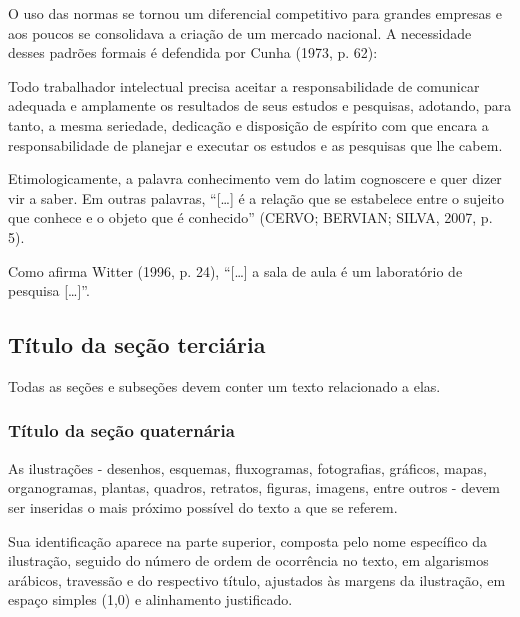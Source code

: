 O uso das normas se tornou um diferencial competitivo para grandes empresas e aos poucos se consolidava a criação de um mercado nacional. A necessidade desses padrões formais é defendida por Cunha (1973, p. 62):

\begin{SingleSpace}
\begin{flushright}
\begin{minipage}[b]{12cm}
\begin{small}
Todo trabalhador intelectual precisa aceitar a responsabilidade de comunicar adequada e amplamente os resultados de seus estudos e pesquisas, adotando, para tanto, a mesma seriedade, dedicação e disposição de espírito com que encara a responsabilidade de planejar e executar os estudos e as pesquisas que lhe cabem.
\end{small}
\end{minipage}
\end{flushright}
\end{SingleSpace}

Etimologicamente, a palavra conhecimento vem do latim cognoscere e quer dizer vir a saber. Em outras palavras, ``[…] é a relação que se estabelece entre o sujeito que conhece e o objeto que é conhecido'' (CERVO; BERVIAN; SILVA, 2007, p. 5).

Como afirma Witter (1996, p. 24), ``[…] a sala de aula é um laboratório de pesquisa […]''.

\subsection{Título da seção terciária}

Todas as seções e subseções devem conter um texto relacionado a elas.

\subsubsection{Título da seção quaternária}

As ilustrações - desenhos, esquemas, fluxogramas, fotografias, gráficos, mapas, organogramas, plantas, quadros, retratos, figuras, imagens, entre outros - devem ser inseridas o mais próximo possível do texto a que se referem.

Sua identificação aparece na parte superior, composta pelo nome específico da ilustração, seguido do número de ordem de ocorrência no texto, em algarismos arábicos, travessão e do respectivo título, ajustados às margens da ilustração, em espaço simples (1,0) e alinhamento justificado.

